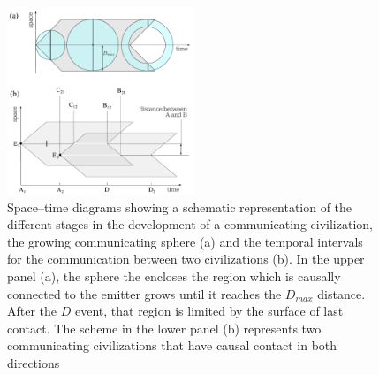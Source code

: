 \documentclass[crop]{CSLB}%
\begin{document}
%
%  





\begin{figure}
   \centering
   \includegraphics[width=0.5\textwidth]{scheme.pdf}
   \caption{Space--time diagrams showing a schematic representation of the 
   different stages in the development of a communicating
   civilization, the growing communicating sphere (a) and the temporal
   intervals for the communication between two civilizations (b).
   In the upper panel (a), the sphere the encloses the region which is
   causally connected to the emitter grows until it reaches the
   $D_{max}$ distance.  After the $D$ event, that region is limited by
   the surface of last contact.
   The scheme in the lower panel (b) represents
   two communicating civilizations that have
   causal contact in both directions}   
   \label{F_scheme}
\end{figure}
\end{document}
